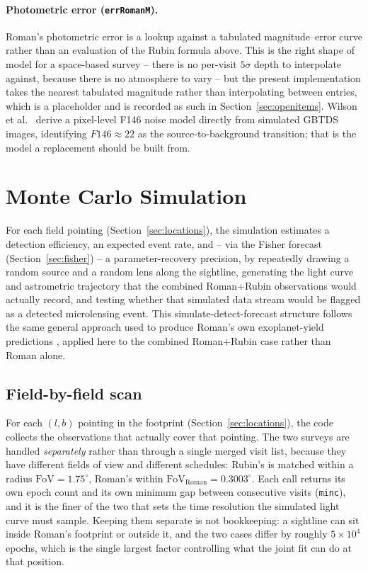 \documentclass[english,10pt,a4paper]{article}
\begin{document}
	\paragraph{Photometric error (\texttt{errRomanM}).} Roman's photometric error is a lookup against a tabulated magnitude--error curve rather than an evaluation of the Rubin formula above. This is the right shape of model for a space-based survey -- there is no per-visit $5\sigma$ depth to interpolate against, because there is no atmosphere to vary -- but the present implementation takes the nearest tabulated magnitude rather than interpolating between entries, which is a placeholder and is recorded as such in Section~\ref{sec:openitems}. Wilson et al.\ \cite{Wilson2023GBTDS} derive a pixel-level F146 noise model directly from simulated GBTDS images, identifying $F146\approx22$ as the source-to-background transition; that is the model a replacement should be built from.
	
	\section{Monte Carlo Simulation}
	\label{sec:montecarlo}
	
	For each field pointing (Section~\ref{sec:locations}), the simulation estimates a detection efficiency, an expected event rate, and -- via the Fisher forecast (Section~\ref{sec:fisher}) -- a parameter-recovery precision, by repeatedly drawing a random source and a random lens along the sightline, generating the light curve and astrometric trajectory that the combined Roman+Rubin observations would actually record, and testing whether that simulated data stream would be flagged as a detected microlensing event. This simulate-detect-forecast structure follows the same general approach used to produce Roman's own exoplanet-yield predictions \cite{penny2019predictions}, applied here to the combined Roman+Rubin case rather than Roman alone.
	
	\subsection{Field-by-field scan}
	
	For each $(l,b)$ pointing in the footprint (Section~\ref{sec:locations}), the code collects the observations that actually cover that pointing. The two surveys are handled \emph{separately} rather than through a single merged visit list, because they have different fields of view and different schedules: Rubin's is matched within a radius $\mathrm{FoV}=1.75^{\circ}$, Roman's within $\mathrm{FoV}_{\mathrm{Roman}}=0.3003^{\circ}$. Each call returns its own epoch count and its own minimum gap between consecutive visits (\texttt{minc}), and it is the finer of the two that sets the time resolution the simulated light curve must sample. Keeping them separate is not bookkeeping: a sightline can sit inside Roman's footprint or outside it, and the two cases differ by roughly $5\times10^{4}$ epochs, which is the single largest factor controlling what the joint fit can do at that position.
\end{document}

